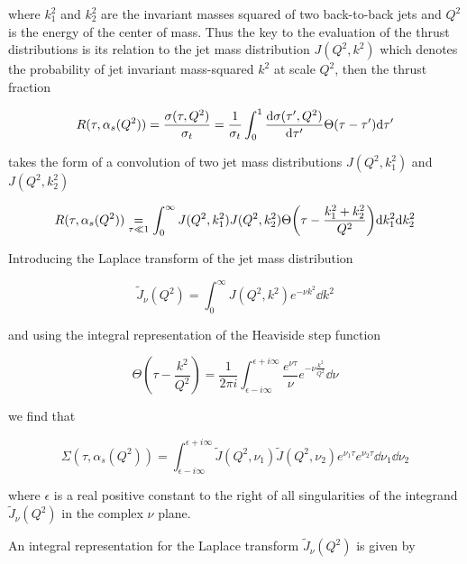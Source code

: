 \documentclass[../main.tex]{subfiles}
\begin{document}
where $k_1^2$ and $k_2^2$ are the invariant masses squared of two back-to-back jets and $Q^2$ is the energy of the center of mass.
Thus the key to the evaluation of the thrust distributions is its relation to the jet mass distribution $J(Q^2,k^2)$ which denotes
the probability of jet invariant mass-squared $k^2$ at scale $Q^2$, then the thrust fraction 

\begin{equation}
    R(\tau,\alpha_s(Q^2)) = \frac{\sigma(\tau,Q^2)}{\sigma_t} = \frac{1}{\sigma_t} 
    \int_0^1 \dv{\sigma(\tau',Q^2)}{\tau'} \Theta (\tau - \tau') \dd \tau'
\end{equation}

takes the form of a convolution of two jet mass distributions $J(Q^2,k_1^2)$ and $J(Q^2,k_2^2)$

\begin{equation}
    R(\tau,\alpha_s(Q^2)) \underset{\tau \ll 1}{=} \int_0^\infty J(Q^2,k_1^2) J(Q^2,k_2^2) \Theta\qty(\tau - \frac{k_1^2+k_2^2}{Q^2}) \dd k_1^2 \dd k_2^2
\end{equation}

Introducing the Laplace transform of the jet mass distribution

\begin{equation}\label{eq:laplace_jet_mass}
    \tilde{J}_\nu(Q^2) = \int_0^\infty J(Q^2,k^2) e^{-\nu k^2} \dd k^2 
\end{equation}

and using the integral representation of the Heaviside step function

\begin{equation}
    \Theta(\tau - \frac{k^2}{Q^2}) = \frac{1}{2\pi i} \int_{\epsilon-i\infty}^{\epsilon+i\infty} \frac{e^{\nu \tau}}{\nu} e^{- \nu \frac{k^2}{Q^2}} \dd \nu
\end{equation}

we find that 

\begin{equation}
    \Sigma(\tau,\alpha_s(Q^2)) = \int_{\epsilon - i \infty}^{\epsilon+i\infty} \tilde{J}(Q^2,\nu_1) \tilde{J}(Q^2,\nu_2) e^{\nu_1 \tau} e^{\nu_2 \tau} \dd \nu_1 \dd \nu_2
\end{equation}

where $\epsilon$ is a real positive constant to the right of all singularities of the integrand $\tilde{J}_\nu(Q^2)$ in the complex $\nu$ plane. 

An integral representation for the Laplace transform $\tilde{J}_\nu(Q^2)$ is given by
\end{document}
